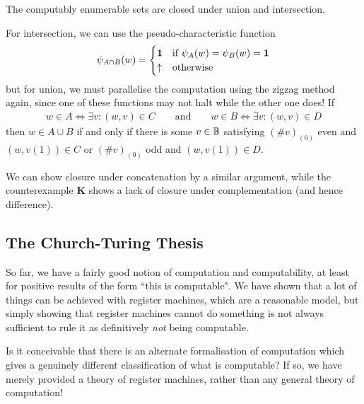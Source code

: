 \documentclass{article}
\begin{document}
\begin{proposition}
	The computably enumerable sets are closed under union and intersection.
\end{proposition}

\begin{prf}
	For intersection, we can use the pseudo-characteristic function
	\[
		\psi_{A \cap B} (w) = \begin{cases}
		\textbf{1} & \text{if } \psi_{A}(w) = \psi_{B}(w) = \textbf{1} \\
		\uparrow & \!\mathrel{\, \text{otherwise}}
		\end{cases}
	\]
	but for union, we must parallelise the computation using the zigzag method again, since one of these functions may not halt while the other one does! If
	\begin{align*}
		w \in A \iff \exists v : (w, v) \in C 
		\qquad \text{and} \qquad              
		w \in B \iff \exists v : (w, v) \in D 
	\end{align*}
	then $w \in A \cup B$ if and only if there is some $v \in \mathbb{B}$ satisfying
	$(\# v)_{(0)}$ even and $(w, v{(1)}) \in C$ or $(\# v)_{(0)}$ odd and $(w, v{(1)}) \in D$.
\end{prf}

We can show closure under concatenation by a similar argument, while the counterexample $\mathbf{K}$ shows a lack of closure under complementation (and hence difference).

\subsection{The Church-Turing Thesis}

So far, we have a fairly good notion of computation and computability, at least for positive results of the form ``this is computable". We have shown that a lot of things can be achieved with register machines, which are a reasonable model, but simply showing that register machines cannot do something is not always sufficient to rule it as definitively \textit{not} being computable.

Is it conceivable that there is an alternate formalisation of computation which gives a genuinely different classification of what is computable? If so, we have merely provided a theory of register machines, rather than any general theory of computation!
\end{document}
